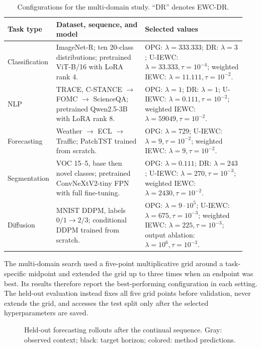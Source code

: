 \begin{table}[H]
\caption{Configurations for the multi-domain study. ``DR'' denotes EWC-DR.}
\label{tab:empirical-protocol}
\centering
\small
\begin{tabular}{@{}p{0.13\linewidth}p{0.38\linewidth}p{0.43\linewidth}@{}}
\toprule
Task type & Dataset, sequence, and model & Selected values \\
\midrule
Classification & ImageNet-R; ten 20-class distributions; pretrained ViT-B/16 with LoRA rank 4. & OPG: $\lambda=333.333$; DR: $\lambda=3$; U-IEWC: $\lambda=33.333,\tau=10^{-4}$; weighted IEWC: $\lambda=11.111,\tau=10^{-2}$. \\
NLP & TRACE, C-STANCE $\rightarrow$ FOMC $\rightarrow$ ScienceQA; pretrained Qwen2.5-3B with LoRA rank 8. & OPG: $\lambda=1$; DR: $\lambda=1$; U-IEWC: $\lambda=0.111,\tau=10^{-2}$; weighted IEWC: $\lambda=59049,\tau=10^{-2}$. \\
Forecasting & Weather $\rightarrow$ ECL $\rightarrow$ Traffic; PatchTST trained from scratch. & OPG: $\lambda=729$; U-IEWC: $\lambda=9,\tau=10^{-2}$; weighted IEWC: $\lambda=9,\tau=10^{-2}$. \\
Segmentation & VOC 15--5, base then novel classes; pretrained ConvNeXtV2-tiny FPN with full fine-tuning. & OPG: $\lambda=0.111$; DR: $\lambda=243$; U-IEWC: $\lambda=270,\tau=10^{-3}$; weighted IEWC: $\lambda=2430,\tau=10^{-2}$. \\
Diffusion & MNIST DDPM, labels $0/1\rightarrow2/3$; conditional DDPM trained from scratch. & OPG: $\lambda=9\cdot10^5$; U-IEWC: $\lambda=675,\tau=10^{-3}$; weighted IEWC: $\lambda=225,\tau=10^{-3}$; output ablation: $\lambda=10^6,\tau=10^{-3}$. \\
\bottomrule
\end{tabular}
\end{table}

The multi-domain search used a five-point multiplicative grid around a task-specific midpoint and extended the grid up to three times when an endpoint was best. Its results therefore report the best-performing configuration in each setting. The held-out evaluation instead fixes all five grid points before validation, never extends the grid, and accesses the test split only after the selected hyperparameters are saved.

\begin{figure}[H]
\centering

\caption[Forecasting rollout comparison]{Held-out forecasting rollouts after the continual sequence. Gray: observed context; black: target horizon; colored: method predictions.}
\label{fig:forecast-rollouts}
\end{figure}

